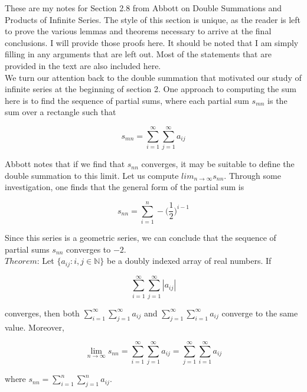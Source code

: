 \documentclass{article}
\begin{document}
These are my notes for Section 2.8 from Abbott on Double Summations and Products of Infinite Series. The style of this section is unique, as the reader is left to prove the various lemmas and theorems necessary to arrive at the final conclusions. I will provide those proofs here. It should be noted that I am simply filling in any arguments that are left out. Most of the statements that are provided in the text are also included here. \\

We turn our attention back to the double summation that motivated our study of infinite series at the beginning of section 2. One approach to computing the sum here is to find the sequence of partial sums, where each partial sum $s_{mn}$ is the sum over a rectangle such that 

\begin{equation}
    s_{mn} = \sum_{i=1}^\infty \sum_{j=1}^\infty a_{ij}
\end{equation}

Abbott notes that if we find that $s_{nn}$ converges, it may be suitable to define the double summation to this limit. Let us compute $lim_{n \to \infty} s_{nn}$. Through some investigation, one finds that the general form of the partial sum is 

\begin{equation}
    s_{nn} = \sum_{i=1}^n -\bigg(\frac{1}{2}\bigg)^{i-1}
\end{equation}

Since this series is a geometric series, we can conclude that the sequence of partial sums $s_{nn}$ converges to $-2$. \\

$Theorem$: Let $\{a_{ij}:i, j \in \mathbb{N}\}$ be a doubly indexed array of real numbers. If 

\begin{equation}
    \sum_{i=1}^\infty \sum_{j=1}^\infty |a_{ij}|
\end{equation}

converges, then both $\sum_{i=1}^\infty \sum_{j=1}^\infty a_{ij}$ and $\sum_{j=1}^\infty \sum_{i=1}^\infty a_{ij}$ converge to the same value. Moreover, 

\begin{equation}
    \lim_{n \to \infty} s_{nn} = \sum_{i=1}^\infty \sum_{j=1}^\infty a_{ij} = \sum_{j=1}^\infty \sum_{i=1}^\infty a_{ij}
\end{equation}

where $s_{nn} = \sum_{i=1}^n \sum_{j=1}^n a_{ij}$. \\
\end{document}
